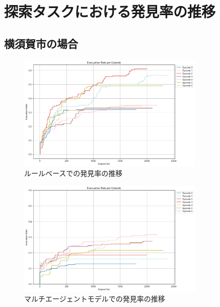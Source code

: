 \chapter{探索タスクにおける発見率の推移}

\section{横須賀市の場合}
\begin{figure}[H] 
  \centering 
  \includegraphics[width=0.8\textwidth]{Figures/YokosukaSearch-RuleResult.png}
  \caption{ルールベースでの発見率の推移} 
\end{figure}

\begin{figure}[H] 
  \centering 
  \includegraphics[width=0.8\textwidth]{Figures/YokosukaSearch-AgentsResult.png}
  \caption{マルチエージェントモデルでの発見率の推移} 
\end{figure}

